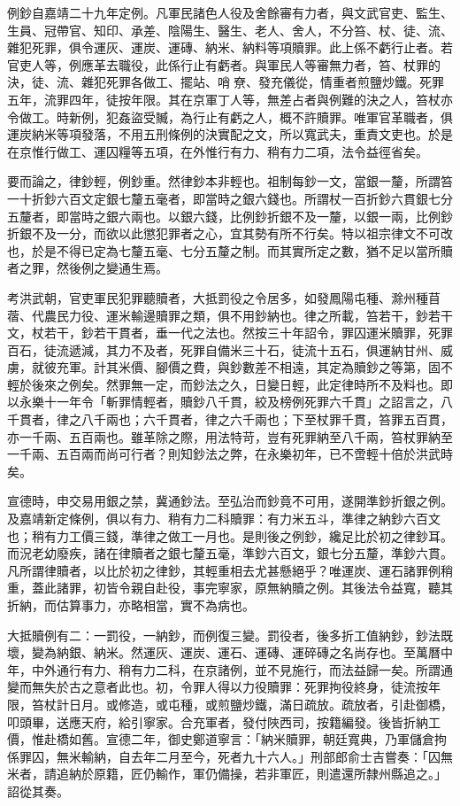 例鈔自嘉靖二十九年定例。凡軍民諸色人役及舍餘審有力者，與文武官吏、監生、生員、冠帶官、知印、承差、陰陽生、醫生、老人、舍人，不分笞、杖、徒、流、雜犯死罪，俱令運灰、運炭、運磚、納米、納料等項贖罪。此上係不虧行止者。若官吏人等，例應革去職役，此係行止有虧者。與軍民人等審無力者，笞、杖罪的決，徒、流、雜犯死罪各做工、擺站、哨尞、發充儀從，情重者煎鹽炒鐵。死罪五年，流罪四年，徒按年限。其在京軍丁人等，無差占者與例難的決之人，笞杖亦令做工。時新例，犯姦盜受贓，為行止有虧之人，概不許贖罪。唯軍官革職者，俱運炭納米等項發落，不用五刑條例的決實配之文，所以寬武夫，重責文吏也。於是在京惟行做工、運囚糧等五項，在外惟行有力、稍有力二項，法令益徑省矣。

要而論之，律鈔輕，例鈔重。然律鈔本非輕也。祖制每鈔一文，當銀一釐，所謂笞一十折鈔六百文定銀七釐五毫者，即當時之銀六錢也。所謂杖一百折鈔六貫銀七分五釐者，即當時之銀六兩也。以銀六錢，比例鈔折銀不及一釐，以銀一兩，比例鈔折銀不及一分，而欲以此懲犯罪者之心，宜其勢有所不行矣。特以祖宗律文不可改也，於是不得已定為七釐五毫、七分五釐之制。而其實所定之數，猶不足以當所贖者之罪，然後例之變通生焉。

考洪武朝，官吏軍民犯罪聽贖者，大抵罰役之令居多，如發鳳陽屯種、滁州種苜蓿、代農民力役、運米輸邊贖罪之類，俱不用鈔納也。律之所載，笞若干，鈔若干文，杖若干，鈔若干貫者，垂一代之法也。然按三十年詔令，罪囚運米贖罪，死罪百石，徒流遞減，其力不及者，死罪自備米三十石，徒流十五石，俱運納甘州、威虜，就彼充軍。計其米價、腳價之費，與鈔數差不相遠，其定為贖鈔之等第，固不輕於後來之例矣。然罪無一定，而鈔法之久，日變日輕，此定律時所不及料也。即以永樂十一年令「斬罪情輕者，贖鈔八千貫，絞及榜例死罪六千貫」之詔言之，八千貫者，律之八千兩也；六千貫者，律之六千兩也；下至杖罪千貫，笞罪五百貫，亦一千兩、五百兩也。雖革除之際，用法特苛，豈有死罪納至八千兩，笞杖罪納至一千兩、五百兩而尚可行者？則知鈔法之弊，在永樂初年，已不啻輕十倍於洪武時矣。

宣德時，申交易用銀之禁，冀通鈔法。至弘治而鈔竟不可用，遂開準鈔折銀之例。及嘉靖新定條例，俱以有力、稍有力二科贖罪：有力米五斗，準律之納鈔六百文也；稍有力工價三錢，準律之做工一月也。是則後之例鈔，纔足比於初之律鈔耳。而況老幼廢疾，諸在律贖者之銀七釐五毫，準鈔六百文，銀七分五釐，準鈔六貫。凡所謂律贖者，以比於初之律鈔，其輕重相去尤甚懸絕乎？唯運炭、運石諸罪例稍重，蓋此諸罪，初皆令親自赴役，事完寧家，原無納贖之例。其後法令益寬，聽其折納，而估算事力，亦略相當，實不為病也。

大抵贖例有二：一罰役，一納鈔，而例復三變。罰役者，後多折工值納鈔，鈔法既壞，變為納銀、納米。然運灰、運炭、運石、運磚、運碎磚之名尚存也。至萬曆中年，中外通行有力、稍有力二科，在京諸例，並不見施行，而法益歸一矣。所謂通變而無失於古之意者此也。初，令罪人得以力役贖罪：死罪拘役終身，徒流按年限，笞杖計日月。或修造，或屯種，或煎鹽炒鐵，滿日疏放。疏放者，引赴御橋，叩頭畢，送應天府，給引寧家。合充軍者，發付陜西司，按籍編發。後皆折納工價，惟赴橋如舊。宣德二年，御史鄭道寧言：「納米贖罪，朝廷寬典，乃軍儲倉拘係罪囚，無米輸納，自去年二月至今，死者九十六人。」刑部郎俞士吉嘗奏：「囚無米者，請追納於原籍，匠仍輸作，軍仍備操，若非軍匠，則遣還所隸州縣追之。」詔從其奏。

